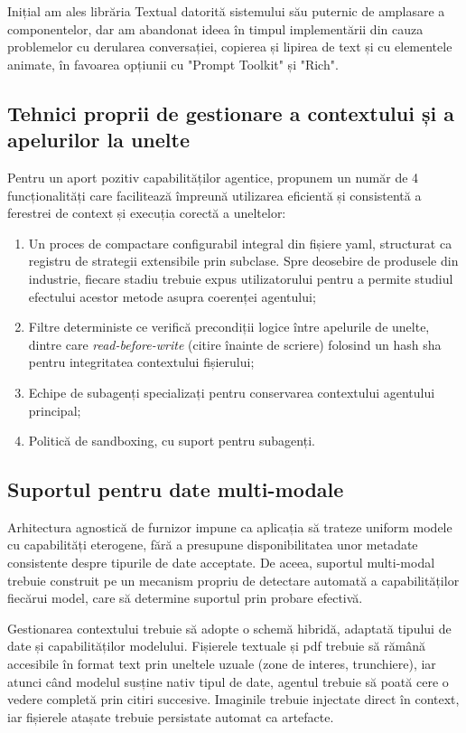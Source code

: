 \documentclass[12pt, a4paper, oneside, romanian]{teza-upb}
\begin{document}
  Inițial am ales librăria Textual datorită sistemului său puternic de amplasare a componentelor, dar am abandonat ideea în timpul implementării din cauza problemelor cu derularea conversației, copierea și lipirea de text și cu elementele animate, în favoarea opțiunii cu "Prompt Toolkit" și "Rich".

  \subsection{Tehnici proprii de gestionare a contextului și a apelurilor la unelte}
 
  Pentru un aport pozitiv capabilităților agentice, propunem un număr de 4 funcționalități care facilitează împreună utilizarea eficientă și consistentă a ferestrei de context și execuția corectă a uneltelor: 
  \begin{enumerate}
    \item Un proces de compactare configurabil integral din fișiere \ac{yaml}, structurat ca registru de strategii extensibile
  prin subclase. Spre deosebire de produsele din industrie, fiecare stadiu trebuie expus utilizatorului pentru a permite studiul efectului acestor metode asupra coerenței agentului;
    \item Filtre deterministe ce verifică precondiții
  logice între apelurile de unelte, dintre care \textit{read-before-write} (citire înainte de scriere) folosind un hash
  \ac{sha} pentru integritatea contextului fișierului;
    \item Echipe de subagenți specializați pentru conservarea contextului agentului principal;
    \item Politică de sandboxing, cu suport pentru subagenți. 
  \end{enumerate}

  \subsection{Suportul pentru date multi-modale}

  Arhitectura agnostică de furnizor impune ca aplicația să trateze uniform modele cu capabilități
  eterogene, fără a presupune disponibilitatea unor metadate consistente despre tipurile de date
  acceptate. De aceea, suportul multi-modal trebuie construit pe un mecanism propriu de detectare
  automată a capabilităților fiecărui model, care să determine suportul prin probare efectivă.

  Gestionarea contextului trebuie să adopte o schemă hibridă, adaptată tipului de date și
  capabilităților modelului. Fișierele textuale și \ac{pdf} trebuie să rămână accesibile în format
  text prin uneltele uzuale (zone de interes, trunchiere), iar atunci când modelul susține nativ
  tipul de date, agentul trebuie să poată cere o vedere completă prin citiri succesive. Imaginile trebuie injectate direct în context, 
  iar fișierele atașate trebuie persistate automat ca artefacte.
\end{document}
